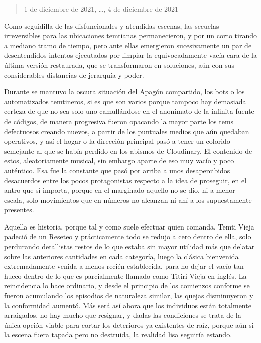 \documentclass[
]{book}
\begin{document}
\begin{quote}
1 de diciembre de 2021, \ldots, 4 de diciembre de 2021
\end{quote}

Como seguidilla de las disfuncionales y atendidas escenas, las secuelas irreversibles para las ubicaciones temtianas permanecieron, y por un corto tirando a mediano tramo de tiempo, pero ante ellas emergieron sucesivamente un par de desentendidos intentos ejecutados por limpiar la equivocadamente vacía cara de la última versión restaurada, que se transformaron en soluciones, aún con sus considerables distancias de jerarquía y poder.

Durante se mantuvo la oscura situación del Apagón compartido, los bots o los automatizados temtineros, si es que son varios porque tampoco hay demasiada certeza de que no sea solo uno camuflándose en el anonimato de la infinita fuente de códigos, de manera progresiva fueron opacando la mayor parte los tems defectuosos creando nuevos, a partir de los puntuales medios que aún quedaban operativos, y así el hogar o la dirección principal pasó a tener un colorido semejante al que se había perdido en los abismos de Cloudinary. El contenido de estos, aleatoriamente musical, sin embargo aparte de eso muy vacío y poco auténtico. Esa fue la constante que pasó por arriba a unos desapercibidos desacuerdos entre los pocos protagonistas respecto a la idea de proseguir, en el antro que sí importa, porque en el marginado aquello no se dio, ni a menor escala, solo movimientos que en números no alcanzan ni ahí a los supuestamente presentes.

Aquella es historia, porque tal y como suele efectuar quien comanda, Temti Vieja padeció de un Reseteo y prácticamente todo se redujo a cero dentro de ella, solo perdurando detallistas restos de lo que estaba sin mayor utilidad más que delatar sobre las anteriores cantidades en cada categoría, luego la clásica bienvenida extremadamente venida a menos recién establecida, para no dejar el vacío tan hueco dentro de lo que es parcialmente llamado como Titiri Vieja en inglés. La reincidencia lo hace ordinario, y desde el principio de los comienzos conforme se fueron acumulando los episodios de naturaleza similar, las quejas disminuyeron y la conformidad aumentó. Más será así ahora que los individuos están totalmente arraigados, no hay mucho que resignar, y dadas las condiciones se trata de la única opción viable para cortar los deterioros ya existentes de raíz, porque aún si la escena fuera tapada pero no destruida, la realidad lisa seguiría estando.
\end{document}
